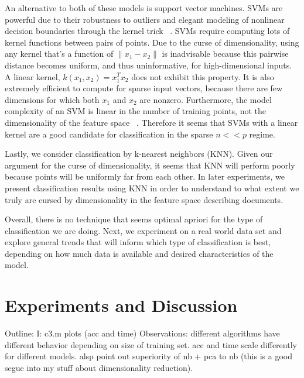 \documentclass[]{article}
\begin{document}
	An alternative to both of these models is support vector machines. SVMs are powerful due to their robustness to outliers and elegant modeling of nonlinear decision boundaries through the kernel trick ~\cite{LectureSVM}. SVMs require computing lots of kernel functions between pairs of points. Due to the curse of dimensionality, using any kernel that's a function of $\lVert x_1 - x_2 \rVert$ is inadvisable because this pairwise distance becomes uniform, and thus uninformative, for high-dimensional inputs. A linear kernel, $k(x_1,x_2) = x_1^Tx_2$ does not exhibit this property. It is also extremely efficient to compute for sparse input vectors, because there are few dimensions for which both $x_1$ and $x_2$ are nonzero. Furthermore, the model complexity of an SVM is linear in the number of training points, not the dimensionality of the feature space ~\cite{LectureSVM}. Therefore it seems that SVMs with a linear kernel are a good candidate for classification in the sparse $n << p$ regime. 

	Lastly, we consider classification by k-nearest neighbors (KNN). Given our argument for the curse of dimensionality, it seems that KNN will perform poorly because points will be uniformly far from each other. In later experiments, we present classification results using KNN in order to understand to what extent we truly are cursed by dimensionality in the feature space describing documents. 

Overall, there is no technique that seems optimal apriori for the type of classification we are doing. Next, we experiment on a real world data set and explore general trends that will inform which type of classification is best, depending on how much data is available and desired characteristics of the model. 

\section{Experiments and Discussion}
Outline: 
I: c3.m plots (acc and time)
Observations: different algorithms have different behavior depending on size of training set. acc and time scale differently for different models.
alsp point out superiority of nb + pca to nb (this is a good segue into my stuff about dimensionality reduction).
\end{document}
